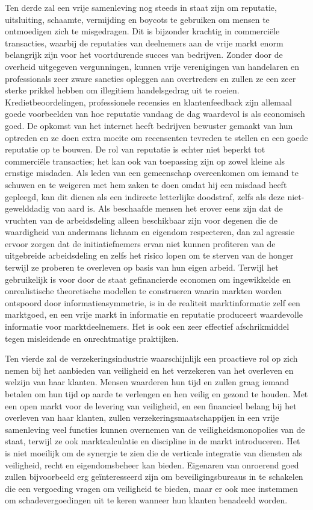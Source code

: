 \documentclass[
  a5paper,
  smalldemyvopaper,11pt,twoside,onecolumn,openright,extrafontsizes,
hidelinks]{memoir}
\begin{document}
Ten derde zal een vrije samenleving nog steeds in staat zijn om
reputatie, uitsluiting, schaamte, vermijding en boycots te gebruiken om
mensen te ontmoedigen zich te misgedragen. Dit is bijzonder krachtig in
commerciële transacties, waarbij de reputaties van deelnemers aan de
vrije markt enorm belangrijk zijn voor het voortdurende succes van
bedrijven. Zonder door de overheid uitgegeven vergunningen, kunnen vrije
verenigingen van handelaren en professionals zeer zware sancties
opleggen aan overtreders en zullen ze een zeer sterke prikkel hebben om
illegitiem handelsgedrag uit te roeien. Kredietbeoordelingen,
professionele recensies en klantenfeedback zijn allemaal goede
voorbeelden van hoe reputatie vandaag de dag waardevol is als economisch
goed. De opkomst van het internet heeft bedrijven bewuster gemaakt van
hun optreden en ze doen extra moeite om recensenten tevreden te stellen
en een goede reputatie op te bouwen. De rol van reputatie is echter niet
beperkt tot commerciële transacties; het kan ook van toepassing zijn op
zowel kleine als ernstige misdaden. Als leden van een gemeenschap
overeenkomen om iemand te schuwen en te weigeren met hem zaken te doen
omdat hij een misdaad heeft gepleegd, kan dit dienen als een indirecte
letterlijke doodstraf, zelfs als deze niet-gewelddadig van aard is. Als
beschaafde mensen het erover eens zijn dat de vruchten van de
arbeidsdeling alleen beschikbaar zijn voor degenen die de waardigheid
van andermans lichaam en eigendom respecteren, dan zal agressie ervoor
zorgen dat de initiatiefnemers ervan niet kunnen profiteren van de
uitgebreide arbeidsdeling en zelfs het risico lopen om te sterven van de
honger terwijl ze proberen te overleven op basis van hun eigen arbeid.
Terwijl het gebruikelijk is voor door de staat gefinancierde economen om
ingewikkelde en onrealistische theoretische modellen te construeren
waarin markten worden ontspoord door informatieasymmetrie, is in de
realiteit marktinformatie zelf een marktgoed, en een vrije markt in
informatie en reputatie produceert waardevolle informatie voor
marktdeelnemers. Het is ook een zeer effectief afschrikmiddel tegen
misleidende en onrechtmatige praktijken.

Ten vierde zal de verzekeringsindustrie waarschijnlijk een proactieve
rol op zich nemen bij het aanbieden van veiligheid en het verzekeren van
het overleven en welzijn van haar klanten. Mensen waarderen hun tijd en
zullen graag iemand betalen om hun tijd op aarde te verlengen en hen
veilig en gezond te houden. Met een open markt voor de levering van
veiligheid, en een financieel belang bij het overleven van haar klanten,
zullen verzekeringsmaatschappijen in een vrije samenleving veel functies
kunnen overnemen van de veiligheidsmonopolies van de staat, terwijl ze
ook marktcalculatie en discipline in de markt introduceren. Het is niet
moeilijk om de synergie te zien die de verticale integratie van diensten
als veiligheid, recht en eigendomsbeheer kan bieden. Eigenaren van
onroerend goed zullen bijvoorbeeld erg geïnteresseerd zijn om
beveiligingsbureaus in te schakelen die een vergoeding vragen om
veiligheid te bieden, maar er ook mee instemmen om schadevergoedingen
uit te keren wanneer hun klanten benadeeld worden.
\end{document}

